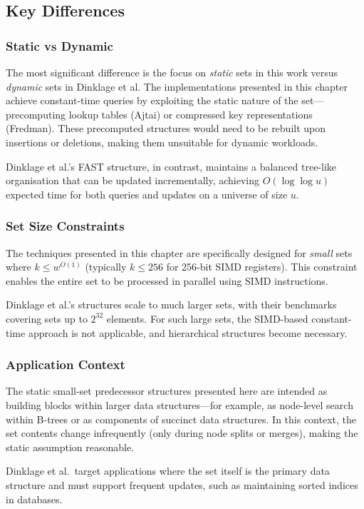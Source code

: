 \subsection{Key Differences}

\subsubsection{Static vs Dynamic}
The most significant difference is the focus on \textit{static} sets in this work versus \textit{dynamic} sets in Dinklage et al. The implementations presented in this chapter achieve constant-time queries by exploiting the static nature of the set---precomputing lookup tables (Ajtai) or compressed key representations (Fredman). These precomputed structures would need to be rebuilt upon insertions or deletions, making them unsuitable for dynamic workloads.

Dinklage et al.'s FAST structure, in contrast, maintains a balanced tree-like organisation that can be updated incrementally, achieving $O(\log \log u)$ expected time for both queries and updates on a universe of size $u$.

\subsubsection{Set Size Constraints}
The techniques presented in this chapter are specifically designed for \textit{small} sets where $k \leq w^{O(1)}$ (typically $k \leq 256$ for 256-bit SIMD registers). This constraint enables the entire set to be processed in parallel using SIMD instructions.

Dinklage et al.'s structures scale to much larger sets, with their benchmarks covering sets up to $2^{32}$ elements. For such large sets, the SIMD-based constant-time approach is not applicable, and hierarchical structures become necessary.

\subsubsection{Application Context}
The static small-set predecessor structures presented here are intended as building blocks within larger data structures---for example, as node-level search within B-trees or as components of succinct data structures. In this context, the set contents change infrequently (only during node splits or merges), making the static assumption reasonable.

Dinklage et al.\ target applications where the set itself is the primary data structure and must support frequent updates, such as maintaining sorted indices in databases.

